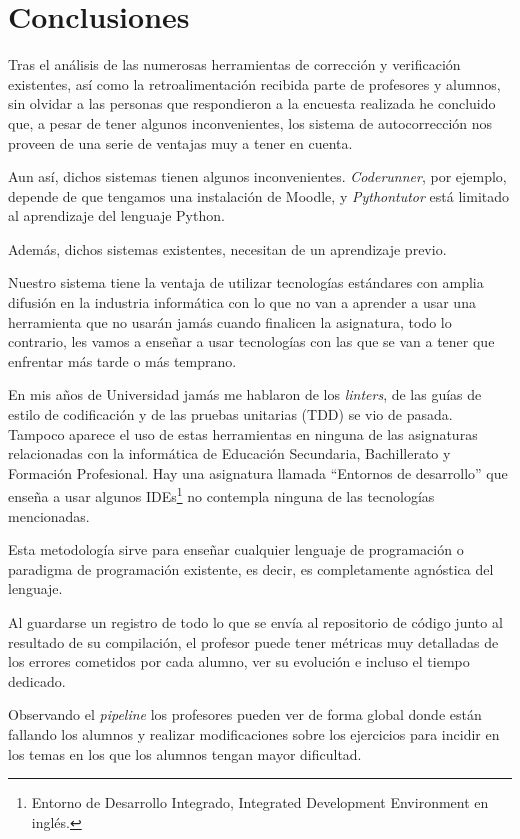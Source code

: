 \chapter{Conclusiones}

Tras el análisis de las numerosas herramientas de corrección y verificación existentes, así como la retroalimentación recibida parte de profesores y alumnos, sin olvidar a las personas que respondieron a la encuesta realizada he concluido que, a pesar de tener algunos inconvenientes, los sistema de autocorrección nos proveen de una serie de ventajas muy a tener en cuenta.

Aun así, dichos sistemas tienen algunos inconvenientes. \textit{Coderunner}, por ejemplo, depende de que tengamos una instalación de Moodle, y \textit{Pythontutor} está limitado al aprendizaje del lenguaje Python.

Además, dichos sistemas existentes, necesitan de un aprendizaje previo.

Nuestro sistema tiene la ventaja de utilizar tecnologías estándares con amplia difusión en la industria informática con lo que no van a aprender a usar una herramienta que no usarán jamás cuando finalicen la asignatura, todo lo contrario, les vamos a enseñar a usar tecnologías con las que se van a tener que enfrentar más tarde o más temprano.

En mis años de Universidad jamás me hablaron de los \textit{linters}, de las guías de estilo de codificación y de las pruebas unitarias (TDD) se vio de pasada. Tampoco aparece el uso de estas herramientas en ninguna de las asignaturas relacionadas con la informática de Educación Secundaria, Bachillerato y Formación Profesional. Hay una asignatura llamada ``Entornos de desarrollo'' que enseña a usar algunos IDEs\footnote{Entorno de Desarrollo Integrado, Integrated Development Environment en inglés.} no contempla ninguna de las tecnologías mencionadas.

Esta metodología sirve para enseñar cualquier lenguaje de programación o paradigma de programación existente, es decir, es completamente agnóstica del lenguaje.

Al guardarse un registro de todo lo que se envía al repositorio de código junto al resultado de su compilación, el profesor puede tener métricas muy detalladas de los errores cometidos por cada alumno, ver su evolución e incluso el tiempo dedicado.

Observando el \textit{pipeline} los profesores pueden ver de forma global donde están fallando los alumnos y realizar modificaciones sobre los ejercicios para incidir en los temas en los que los alumnos tengan mayor dificultad.

